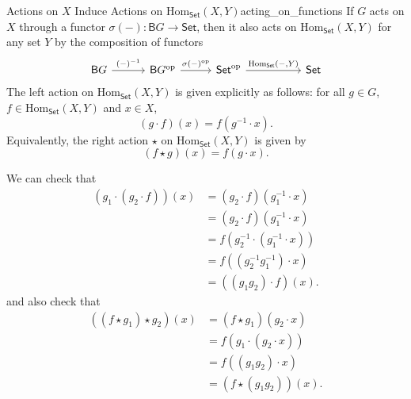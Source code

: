 \begin{example}{Actions on $X$ Induce Actions on $\mathrm{Hom}_{\mathsf{Set}}(X,Y)$}{acting_on_functions}
    If $G$ acts on $X$ through a functor $\sigma(-):\mathsf{B}G\to\mathsf{Set}$, then it also acts on $\mathrm{Hom}_{\mathsf{Set}}(X,Y)$ for any set $Y$ by the composition of functors
    \[
        \begin{tikzcd}[ampersand replacement=\&, column sep=5em, row sep=3em]
            \mathsf{B}G \arrow[r,"{(-)}^{-1}"] \&[-2em] \mathsf{B}G^{\mathrm{op}} \arrow[r, "\sigma(-)^{\mathrm{op}}"] \&[-2.2em] \mathsf{Set}^{\mathrm{op}} \arrow[r, "{\mathrm{Hom}_{\mathsf{Set}}(-,Y)}"] \& \mathsf{Set}
        \end{tikzcd}
    \]
    The left action on $\mathrm{Hom}_{\mathsf{Set}}(X,Y)$ is given explicitly as follows: for all $g\in G$, $f\in \mathrm{Hom}_{\mathsf{Set}}(X,Y)$ and $x\in X$,
    \[
        (g\cdot f)(x)=f(g^{-1}\cdot x).
    \]
    Equivalently, the right action $\star$ on $\mathrm{Hom}_{\mathsf{Set}}(X,Y)$ is given by
    \[
        (f\star g)(x)=f(g\cdot x).
    \]


\end{example}

\begin{prf}
    We can check that
    \begin{align*}
        (g_1\cdot (g_2\cdot f))(x) & =\left(g_2\cdot f\right)\left(g_1^{-1}\cdot x\right)     \\
                                   & =\left(g_2\cdot f\right)\left(g_1^{-1}\cdot x\right)     \\
                                   & =f\left(g_2^{-1}\cdot\left(g_1^{-1}\cdot x\right)\right) \\
                                   & =f\left(\left(g_2^{-1} g_1^{-1}\right)\cdot x\right)     \\
                                   & =\left(\left(g_1g_2\right)\cdot f\right)(x).
    \end{align*}
    and also check that
    \begin{align*}
        ((f\star g_1)\star g_2)(x)
         & =\left(f\star g_1\right)\left(g_2\cdot x\right) \\
         & =f\left(g_1\cdot\left(g_2\cdot x\right)\right)  \\
         & =f\left((g_1g_2)\cdot x\right)                  \\
         & =\left(f\star (g_1 g_2)\right)(x).
    \end{align*}
\end{prf}

